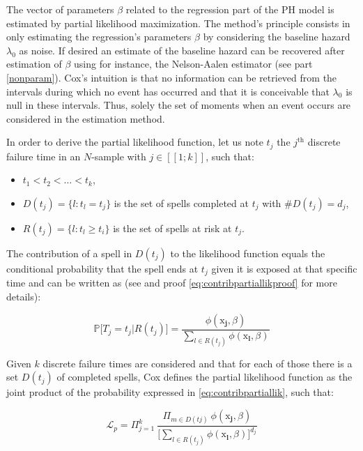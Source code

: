 \documentclass[
]{book}
\providecommand{\tightlist}{%
  \setlength{\itemsep}{0pt}\setlength{\parskip}{0pt}}
\begin{document}
The vector of parameters \(\beta\) related to the regression part of the PH model is estimated by partial likelihood maximization. The method's principle consists in only estimating the regression's parameters \(\beta\) by considering the baseline hazard \(\lambda_0\) as noise. If desired an estimate of the baseline hazard can be recovered after estimation of \(\beta\) using for instance, the Nelson-Aalen estimator (see part \ref{nonparam}). Cox's intuition is that no information can be retrieved from the intervals during which no event has occurred and that it is conceivable that \(\lambda_0\) is null in these intervals. Thus, solely the set of moments when an event occurs are considered in the estimation method.

In order to derive the partial likelihood function, let us note \(t_j\) the \(j^{\text{th}}\) discrete failure time in an \(N\)-sample with \(j \in [\![1; k]\!]\), such that:

\begin{itemize}
\tightlist
\item
  \(t_1 < t_2 < \dots < t_k\),
\item
  \(D(t_j) = \{l: t_l = t_j\}\) is the set of spells completed at \(t_j\) with \(\#D(t_j) = d_j\),
\item
  \(R(t_j) = \{l: t_l \geq t_i\}\) is the set of spells at risk at \(t_j\).
\end{itemize}

The contribution of a spell in \(D(t_j)\) to the likelihood function equals the conditional probability that the spell ends at \(t_j\) given it is exposed at that specific time and can be written as (see \citet{CAMERON_TRIVEDI} and proof \eqref{eq:contribpartiallikproof} for more details):

\begin{equation}
  \mathbb{P}\big[T_j = t_j | R(t_j) \big] = \frac{\phi(\pmb{\mathrm{x}_j}, \beta)}{\sum_{l \in R(t_j)} \phi(\pmb{\mathrm{x}_l}, \beta)}
  \label{eq:contribpartiallik}
\end{equation}

Given \(k\) discrete failure times are considered and that for each of those there is a set \(D(t_j)\) of completed spells, Cox defines the partial likelihood function as the joint product of the probability expressed in \eqref{eq:contribpartiallik}, such that:

\begin{equation}
  \mathcal{L}_p = \Pi_{j=1}^{k} \ \frac{\Pi_{m \in D(tj)} \ \phi(\pmb{\mathrm{x}_j}, \beta)}{\Big[\sum_{l \in R(t_j)} \phi(\pmb{\mathrm{x}_l}, \beta)\Big]^{d_j}}
  \label{eq:partlik}
\end{equation}
\end{document}
